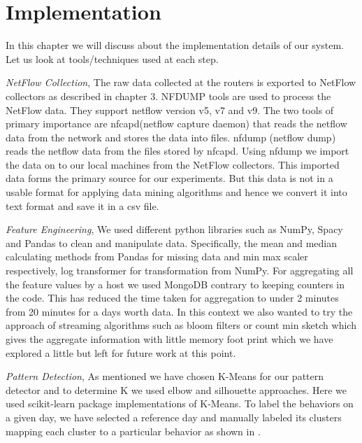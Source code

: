 \label{key}%

\chapter{Implementation}

In this chapter we will discuss about the implementation details of our system. Let us look at tools/techniques used at each step.  

\textit{NetFlow Collection},  The raw data collected at the routers is exported to NetFlow collectors as described in chapter 3. NFDUMP \cite{} tools are used to process the NetFlow data. They support netflow version v5, v7 and v9. The two tools of primary importance are nfcapd(netflow capture daemon) that reads the netflow data from the network and stores the data into files. nfdump (netflow dump) reads the netflow data from the files stored by nfcapd. Using nfdump we import the data on to our local machines
from the NetFlow collectors. This imported data forms the
primary source for our experiments. But this data is not in a usable format for applying data mining algorithms and hence we convert it into text format and save it in a csv file.

\textit{Feature Engineering}, We used different python libraries such as NumPy, Spacy and Pandas to clean and manipulate data. Specifically, the mean and median calculating methods from Pandas for missing data and min max scaler respectively, log transformer for transformation from NumPy. For aggregating all the feature values by a host we used MongoDB contrary to keeping counters in the code. This has reduced the time taken  for aggregation to under 2 minutes from 20 minutes for a days worth data. In this context we also wanted to try the approach of streaming algorithms such as bloom filters or count min sketch which gives the aggregate information with little memory foot print which we have explored a little but left for future work at this point.

\textit{Pattern Detection}, As mentioned we have chosen K-Means for our pattern detector and to determine K we used elbow and silhouette approaches. Here we used scikit-learn package implementations of K-Means. To label the behaviors on a given day, we have selected a reference day and manually labeled its clusters mapping each cluster to a particular behavior as shown in .

